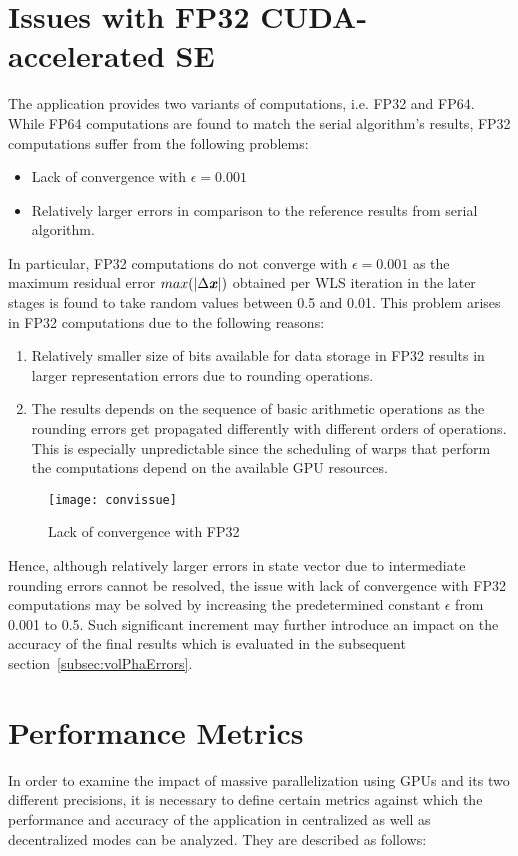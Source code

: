 \documentclass[thesis.tex]{subfiles}
\begin{document}
\section{Issues with FP32 CUDA-accelerated SE}\label{sec:fp32issues}
The application provides two variants of computations, i.e. FP32 and FP64. While FP64 computations are found to match the serial algorithm’s results, FP32 computations suffer from the following problems:
\begin{itemize}
	\item Lack of convergence with $\epsilon = 0.001$
	\item Relatively larger errors in comparison to the reference results from serial algorithm.
\end{itemize}
In particular, FP32 computations do not converge with $\epsilon = 0.001$ as the maximum residual error $max(|\Delta \textbf{\textit{x}}|)$ obtained per WLS iteration in the later stages is found to take random values between 0.5 and 0.01. This problem arises in FP32 computations due to the following reasons:
\begin{enumerate}
	\item Relatively smaller size of bits available for data storage in FP32 results in larger representation errors due to rounding operations.
	\item The results depends on the sequence of basic arithmetic operations as the rounding errors get propagated differently with different orders of operations. This is especially unpredictable since the scheduling of warps that perform the computations depend on the available GPU resources.
\end{enumerate}
\begin{figure}[H]
	\centering
	\texttt{[image: convissue]}
	\caption{Lack of convergence with FP32}
	\label{fig:convissue}
\end{figure}
Hence, although relatively larger errors in state vector due to intermediate rounding errors cannot be resolved, the issue with lack of convergence with FP32 computations may be solved by increasing the predetermined constant $\epsilon$ from 0.001 to 0.5. Such significant increment may further introduce an impact on the accuracy of the final results which is evaluated in the subsequent section~\ref{subsec:volPhaErrors}.


\section{Performance Metrics}\label{sec:perfMetr}
In order to examine the impact of massive parallelization using GPUs and its two different precisions, it is necessary to define certain metrics against which the performance and accuracy of the application in centralized as well as decentralized modes can be analyzed. They are described as follows:
\end{document}
